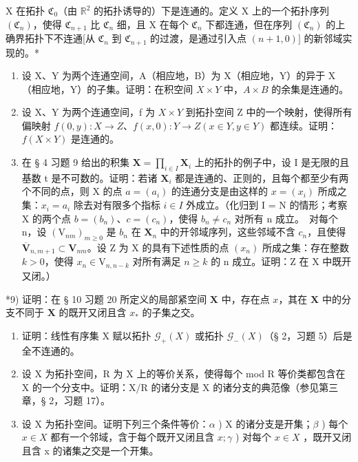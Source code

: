 X 在拓扑 \(\mathfrak{C}_0\)（由 \(\mathbb{R}^2\) 的拓扑诱导的）下是连通的。定义 X 上的一个拓扑序列 \((\mathfrak{C}_n)\)，使得 \(\mathfrak{C}_{n+1}\) 比 \(\mathfrak{C}_n\) 细，且 X 在每个 \(\mathfrak{C}_n\) 下都连通，但在序列 \((\mathfrak{C}_n)\) 的上确界拓扑下不连通{[}从 \(\mathfrak{C}_n\) 到 \(\mathfrak{C}_{n+1}\) 的过渡，是通过引入点 \((n+1,0)]\) 的新邻域实现的。*

\begin{enumerate}
\def\labelenumi{\arabic{enumi})}
\setcounter{enumi}{5}
\item
  设 X、Y 为两个连通空间，A（相应地，B）为 X（相应地，Y）的异于 X（相应地，Y）的子集。证明：在积空间 \(X \times Y\) 中，\(A \times B\) 的余集是连通的。
\item
  设 X、Y 为两个连通空间，f 为 \(X \times Y\) 到拓扑空间 Z 中的一个映射，使得所有偏映射 \(f(0, y) : X \to Z\)、\(f(x, 0) : Y \to Z (x \in Y, y \in Y)\) 都连续。证明：\(f(X \times Y)\) 是连通的。
\item
  在 § 4 习题 9 给出的积集 \(\mathbf{X} = \prod_{i\in I}\mathbf{X}_i\) 上的拓扑的例子中，设 I 是无限的且基数 t 是不可数的。证明：若诸 \(\mathbf{X}_i\) 都是连通的、正则的，且每个都至少有两个不同的点，则 X 的点 \(a = (a_i)\) 的连通分支是由这样的 \(x = (x_i)\) 所成之集：\(x_{i} = a_{i}\) 除去对有限多个指标 \(i\in I\) 外成立。（化归到 I = N 的情形；考察 X 的两个点 \(b = (b_n)\)、\(c = (c_n)\)，使得 \(b_{n}\neq c_{n}\) 对所有 n 成立。~对每个 n，设 \((\mathrm{V}_{nm})_{m\geqslant 0}\) 是 \(b_{n}\) 在 \(\mathbf{X}_n\) 中的开邻域序列，这些邻域不含 \(c_{n}\)，且使得 \(\overline{\mathbf{V}}_{n,m + 1}\subset \mathbf{V}_{nm}\)。设 Z 为 X 的具有下述性质的点 \((x_{n})\) 所成之集：存在整数 \(k > 0\)，使得 \(x_{n}\in \mathrm{V}_{n,n - k}\) 对所有满足 \(n\geqslant k\) 的 n 成立。证明：Z 在 X 中既开又闭。）
\end{enumerate}

*9) 证明：在 § 10 习题 20 所定义的局部紧空间 \(\mathbf{X}\) 中，存在点 \(x\)，其在 \(\mathbf{X}\) 中的分支不同于 \(\mathbf{X}\) 的既开又闭且含 \(x_*\) 的子集之交。

\begin{enumerate}
\def\labelenumi{\arabic{enumi})}
\setcounter{enumi}{9}
\item
  证明：线性有序集 X 赋以拓扑 \(\mathcal{G}_{+}(X)\) 或拓扑 \(\mathcal{G}_{-}(X)\)（§ 2，习题 5）后是全不连通的。
\item
  设 X 为拓扑空间，R 为 X 上的等价关系，使得每个 mod R 等价类都包含在 X 的一个分支中。证明：X/R 的诸分支是 X 的诸分支的典范像（参见第三章，§ 2，习题 17）。
\item
  设 X 为拓扑空间。证明下列三个条件等价：\(\alpha\) ) X 的诸分支是开集；\(\beta\) ) 每个 \(x \in X\) 都有一个邻域，含于每个既开又闭且含 \(x; \gamma\) ) 对每个 \(x \in X\) ，既开又闭且含 x 的诸集之交是一个开集。
\end{enumerate}

